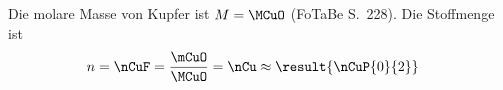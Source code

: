 Die molare Masse von Kupfer ist $M = \MCuO$ (FoTaBe S.~228). Die Stoffmenge ist
\begin{align}
 n &= \nCuF = \frac{\mCuO}{\MCuO} = \nCu \approx \result{\nCuP{0}{2}}
\end{align}
